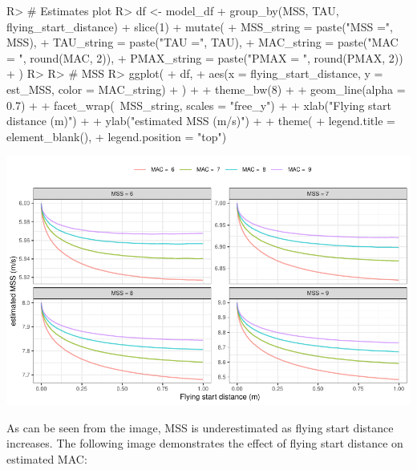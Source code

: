 \documentclass[
]{jss}
\begin{document}
\begin{CodeChunk}
\begin{CodeInput}
R> # Estimates plot
R> df <- model_df %
+   group_by(MSS, TAU, flying_start_distance) %
+   slice(1) %
+   mutate(
+     MSS_string = paste("MSS =", MSS),
+     TAU_string = paste("TAU =", TAU),
+     MAC_string = paste("MAC = ", round(MAC, 2)),
+     PMAX_string = paste("PMAX = ", round(PMAX, 2))
+   )
R> 
R> # MSS
R> ggplot(
+   df,
+   aes(x = flying_start_distance, y = est_MSS, color = MAC_string)
+ ) +
+   theme_bw(8) +
+   geom_line(alpha = 0.7) +
+   facet_wrap(~MSS_string, scales = "free_y") +
+   xlab("Flying start distance (m)") +
+   ylab("estimated MSS (m/s)") +
+   theme(
+     legend.title = element_blank(), 
+     legend.position = "top")
\end{CodeInput}


\begin{center}\includegraphics[width=1\linewidth]{paper_files/figure-latex/unnamed-chunk-24-1} \end{center}

\end{CodeChunk}

As can be seen from the image, MSS is underestimated as flying start distance increases. The following image demonstrates the effect of flying start distance on estimated MAC:
\end{document}
